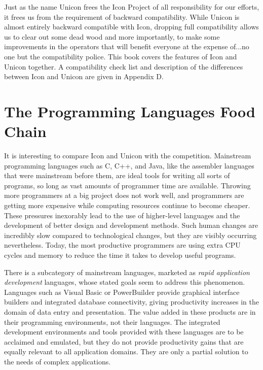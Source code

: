 Just as the name Unicon frees the Icon Project of all responsibility for
our efforts, it frees us from the requirement of backward
compatibility. While Unicon is almost entirely backward compatible
with Icon, dropping full
compatibility allows us to clear out some dead wood and more
importantly, to make some improvements in the operators that will
benefit everyone at the expense of...no one but the compatibility
police.
This book covers the features of Icon and Unicon together. A
compatibility check list and description of the differences
between Icon and Unicon are given in Appendix D.

\section*{The Programming Languages Food Chain}

It is interesting to compare Icon and Unicon with the competition.
Mainstream programming languages
such as C, C++, and Java, like the assembler languages that
were mainstream before them, are ideal tools
for writing all sorts of programs, so long as vast amounts of
programmer time are available. Throwing more programmers at a big
project does not work well, and programmers are getting more expensive
while computing
resources continue to become cheaper. These pressures
inexorably lead to the use of higher-level languages and the
development of better design and development methods. Such human
changes are incredibly slow compared to technological changes, but they
are visibly occurring nevertheless. Today, the most
productive programmers are using extra CPU cycles and memory
to reduce the time it takes to develop useful programs.

There is a subcategory of mainstream languages, marketed as \textit{rapid application development}
languages, whose stated goals seem to address this phenomenon.
Languages such as Visual Basic or
PowerBuilder provide
graphical interface builders and integrated database connectivity,
giving productivity increases in the domain of data entry and
presentation. The value added in these products are in their
programming environments, not their languages. The integrated development environments and tools
provided with these languages are to be acclaimed and emulated, but
they do not provide productivity gains that are equally relevant to all
application domains. They are only a partial solution to the needs of
complex applications.

